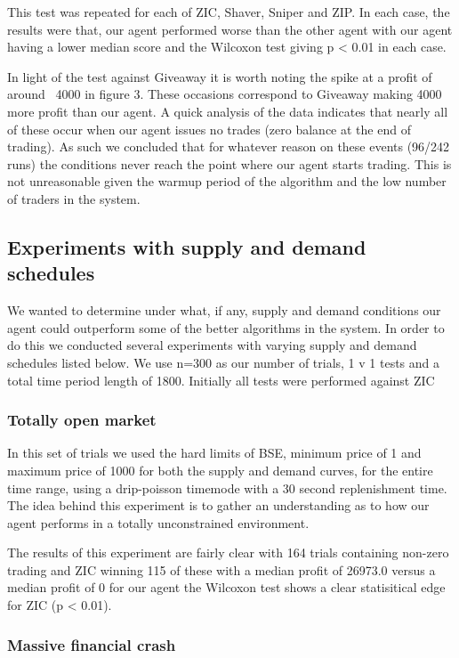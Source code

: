 \documentclass{acm_proc_article-sp}
\begin{document}
This test was repeated for each of ZIC, Shaver, Sniper and ZIP. In each case,
the results were that, our agent performed worse than the other
agent with our agent having a lower median score and the Wilcoxon test giving
p < 0.01 in each case.

In light of the test against Giveaway it is  worth noting the spike at a profit
of around ~4000 in figure 3.  These occasions correspond to Giveaway making
4000 more profit than our agent. A quick analysis of the data indicates that
nearly all of these occur when our agent issues no trades (zero balance at the
end of trading). As such we concluded that for whatever reason on these events
(96/242 runs) the conditions never reach the point where our agent starts
trading. This is not unreasonable given the warmup period of the algorithm and
the low number of traders in the system.

\subsection{Experiments with supply and demand schedules}

We wanted to determine under what, if any, supply and demand conditions our
agent could outperform some of the better algorithms in the system. In order to
do this we conducted several experiments with varying supply and demand
schedules listed below. We use n=300 as our number of trials, 1 v 1 tests and a
total time period length of 1800. Initially all tests were performed against
ZIC

\subsubsection{Totally open market}

In this set of trials we used the hard limits of BSE, minimum price of 1 and
maximum price of 1000 for both the supply and demand curves, for the entire
time range, using a drip-poisson timemode with a 30 second replenishment time.
The idea behind this experiment is to gather an understanding as to how our
agent performs in a totally unconstrained environment.

The results of this experiment are fairly clear with 164 trials containing
non-zero trading and ZIC winning 115 of these with a median profit of 26973.0
versus a median profit of 0 for our agent the Wilcoxon test shows a clear
statisitical edge for ZIC (p < 0.01).

\subsubsection{Massive financial crash}
\end{document}

